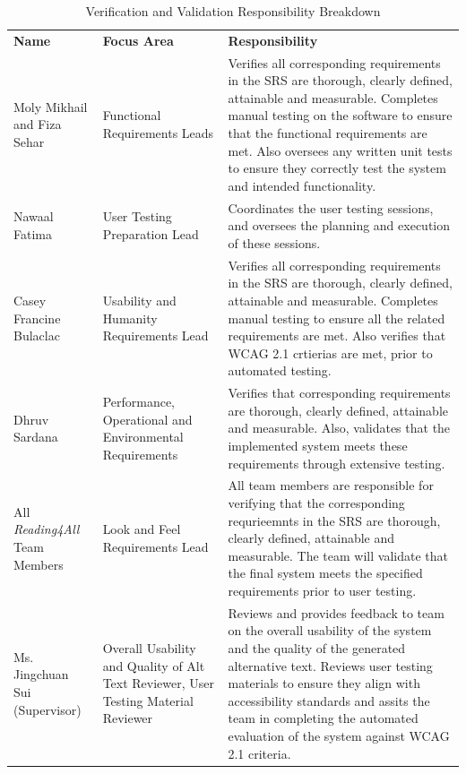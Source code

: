 \documentclass[12pt, titlepage]{article}
\begin{document}
\begin{table}[H]
    \centering
    \caption{Verification and Validation Responsibility Breakdown}
    \label{tab:data-dictionary-reading4all}
    \begin{tabular}{p{3.0cm} C{3.8cm} p{7.3cm}}
    
      \textbf{Name} & \textbf{ Focus Area } & \textbf{Responsibility} \\
      
      Moly Mikhail and Fiza Sehar & Functional Requirements Leads & Verifies all corresponding requirements in the SRS are thorough, clearly defined, attainable and measurable. Completes manual testing on the software to ensure that the functional requirements are met. Also oversees any written unit tests to ensure they correctly test the system and intended functionality. \\
      
      Nawaal Fatima & User Testing Preparation Lead & Coordinates the user testing sessions, and oversees the planning and execution of these sessions. \\
       
      Casey Francine Bulaclac & Usability and Humanity Requirements Lead & Verifies all corresponding requirements in the SRS are thorough, clearly defined, attainable and measurable. Completes manual testing to ensure all the related requirements are met. Also verifies that WCAG 2.1 crtierias are met, prior to automated testing. \\
       
      Dhruv Sardana & Performance, Operational and Environmental Requirements & Verifies that corresponding requirements are thorough, clearly defined, attainable and measurable. Also, validates that the implemented system meets these requirements through extensive testing.  \\
       
      All \textit{Reading4All} Team Members & Look and Feel Requirements Lead & All team members are responsible for verifying that the corresponding requrieemnts in the SRS are thorough, clearly defined, attainable and measurable. The team will validate that the final system meets the specified requirements prior to user testing. \\
      
      Ms. Jingchuan Sui (Supervisor) & Overall Usability and Quality of Alt Text Reviewer, User Testing Material Reviewer& Reviews and provides feedback to team on the overall usability of the system and the quality of the generated alternative text. Reviews user testing materials to ensure they align with accessibility standards and assits the team in completing the automated evaluation of the system against WCAG 2.1 criteria. \\ 
      
    \end{tabular}
  \end{table}
  
\end{document}
